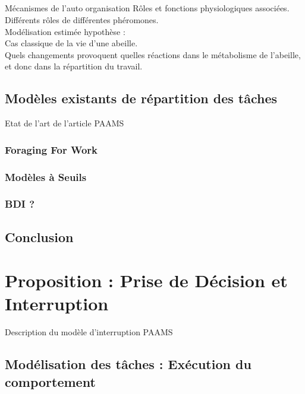 \documentclass[11pt,a4paper]{report}
\begin{document}
		\paragraph{}
		Mécanismes de l'auto organisation
			Rôles et fonctions physiologiques associées.\\
			Différents rôles de différentes phéromones.\\
			Modélisation estimée hypothèse : \\
			Cas classique de la vie d'une abeille.\\
			Quels changements provoquent quelles réactions dans le métabolisme de l'abeille, et donc dans la répartition du travail.
	\section{Modèles existants de répartition des tâches}
	Etat de l'art de l'article PAAMS
		\subsection{Foraging For Work}
		\subsection{Modèles à Seuils}
		\subsection{BDI ?}
			
	\section*{Conclusion}
	
\chapter{Proposition : Prise de Décision et Interruption}
	Description du modèle d'interruption PAAMS	
	
	\section{Modélisation des tâches : Exécution du comportement}	
	
\end{document}
